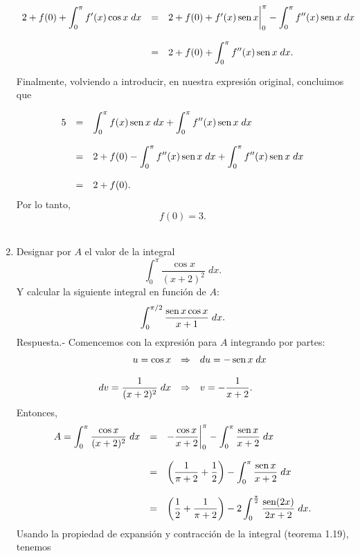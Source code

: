 \begin{enumerate}[\bfseries 1.]
	$$
	\begin{array}{rcl}
	    2+f(0)+\displaystyle\int_0^\pi f'(x)\cos x\; dx&=& 2+f(0)+f'(x)\mathop{\mbox{\normalfont sen}}\nolimits x\bigg|_0^\pi - \displaystyle\int_0^\pi f''(x)\mathop{\mbox{\normalfont sen}}\nolimits x\; dx\\\\
							   &=& 2+f(0)+\displaystyle\int_0^\pi f''(x)\mathop{\mbox{\normalfont sen}}\nolimits x\; dx.
	\end{array}
	$$

	Finalmente, volviendo a introducir, en nuestra expresión original, concluimos que

	$$
	\begin{array}{rcl}
	    5 &=& \displaystyle\int_0^\pi f(x)\mathop{\mbox{\normalfont sen}}\nolimits x\; dx + \int_0^\pi f''(x)\mathop{\mbox{\normalfont sen}}\nolimits x\; dx\\\\
	      &=& 2+f(0)-\displaystyle\int_0^\pi f''(x)\mathop{\mbox{\normalfont sen}}\nolimits x\; dx+\displaystyle\int_0^\pi f''(x)\mathop{\mbox{\normalfont sen}}\nolimits x\; dx\\\\
	      &=& 2+f(0).
	\end{array}
	$$
	Por lo tanto,
	$$f(0)=3.$$\\


    \item Designar por $A$ el valor de la integral
    $$\int_0^\pi \dfrac{\cos x}{\left(x+2\right)^2}\; dx.$$
    Y calcular la siguiente integral en función de $A$:
    $$\int_0^{\pi/2}\dfrac{\mathop{\mbox{\normalfont sen}}\nolimits x\cos x}{x+1}\; dx.$$
	Respuesta.-\; Comencemos con la expresión para $A$ integrando por partes:
	$$
	\begin{array}{rcl}
	    u=\cos x &\Rightarrow& du=-\mathop{\mbox{\normalfont sen}}\nolimits x\; dx\\\\
	    dv=\dfrac{1}{(x+2)^2}\; dx &\Rightarrow& v=-\dfrac{1}{x+2}.
	\end{array}
	$$
	Entonces,
	$$
	\begin{array}{rcl}
	    A = \displaystyle\int_0^\pi \dfrac{\cos x}{(x+2)^2}\; dx &=& -\dfrac{\cos x}{x+2}\bigg|_0^\pi - \displaystyle\int_0^\pi \dfrac{\mathop{\mbox{\normalfont sen}}\nolimits x}{x+2}\; dx\\\\
								     &=& \left(\dfrac{1}{\pi+2}+\dfrac{1}{2}\right)-\displaystyle\int_0^\pi \dfrac{\mathop{\mbox{\normalfont sen}}\nolimits x}{x+2}\; dx\\\\
								     &=& \left(\dfrac{1}{2}+\dfrac{1}{\pi + 2}\right)-2\displaystyle\int_0^{\frac{\pi}{2}} \dfrac{\mathop{\mbox{\normalfont sen}}\nolimits(2x)}{2x+2}\; dx.
	\end{array}
	$$
	Usando la propiedad de expansión y contracción de la integral (teorema 1.19), tenemos


\end{enumerate}
